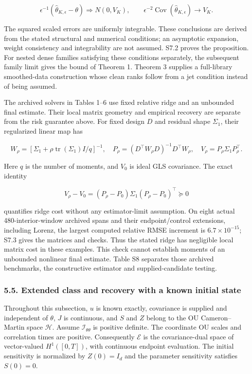 \documentclass[
  american,
  11pt,
]{article}
\begin{document}
\[
\epsilon^{-1}(\widehat\theta_{K,\epsilon}-\theta)\Rightarrow N(0,V_K),\qquad
\epsilon^{-2}\operatorname{Cov}(\widehat\theta_{K,\epsilon})\to V_K.
\]

The squared scaled errors are uniformly integrable. These conclusions
are derived from the stated structural and numerical conditions; an
asymptotic expansion, weight consistency and integrability are not
assumed. S7.2 proves the proposition. For nested dense families
satisfying these conditions separately, the subsequent family limit
gives the bound of Theorem 1. Theorem 3 supplies a full-library
smoothed-data construction whose clean ranks follow from a jet condition
instead of being assumed.

The archived solvers in Tables 1--6 use fixed relative ridge and an
unbounded final estimate. Their local matrix geometry and empirical
recovery are separate from the risk guarantee above. For fixed design
\(D\) and residual shape \(\Sigma_1\), their regularized linear map has

\[
W_\rho=[\Sigma_1+\rho\operatorname{tr}(\Sigma_1)I/q]^{-1},\quad
P_\rho=(D^\top W_\rho D)^{-1}D^\top W_\rho,\quad
V_\rho=P_\rho\Sigma_1P_\rho^\top.
\]

Here \(q\) is the number of moments, and \(V_0\) is ideal GLS
covariance. The exact identity

\[
V_\rho-V_0=(P_\rho-P_0)\Sigma_1(P_\rho-P_0)^\top\succeq0
\]

quantifies ridge cost without any estimator-limit assumption. On eight
actual 480-interior-window archived spans and their endpoint/control
extensions, including Lorenz, the largest computed relative RMSE
increment is \(6.7\times10^{-15}\); S7.3 gives the matrices and checks.
Thus the stated ridge has negligible local matrix cost in these
examples. This check cannot establish moments of an unbounded nonlinear
final estimate. Table S8 separates those archived benchmarks, the
constructive estimator and supplied-candidate testing.

\subsubsection{5.5. Extended class and recovery with a known initial
state}\label{extended-class-and-recovery-with-a-known-initial-state}

Throughout this subsection, \(u\) is known exactly, covariance is
supplied and independent of \(\theta\), \(J\) is continuous, and \(S\)
and \(Z\) belong to the OU Cameron--Martin space \(\mathcal H\). Assume
\(\mathcal I_{\theta\theta}\) is positive definite. The coordinate OU
scales and correlation times are positive. Consequently \(\mathcal E\)
is the covariance-dual space of vector-valued \(H^1([0,T])\), with
continuous endpoint evaluation. The initial sensitivity is normalized by
\(Z(0)=I_d\) and the parameter sensitivity satisfies \(S(0)=0\).
\end{document}
